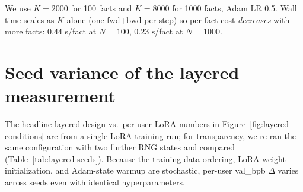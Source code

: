 \documentclass[11pt]{article}
\begin{document}
We use $K = 2000$ for 100 facts and $K = 8000$ for 1000 facts, Adam
LR 0.5. Wall time scales as $K$ alone (one fwd+bwd per step) so per-fact
cost \emph{decreases} with more facts: 0.44 s/fact at $N{=}100$,
0.23 s/fact at $N{=}1000$.

\section{Seed variance of the layered measurement}
\label{app:layered-seeds}

The headline layered-design vs.\ per-user-LoRA numbers in
Figure~\ref{fig:layered-conditions} are
from a single LoRA training run; for transparency, we re-ran the same
configuration with two further RNG states and compared
(Table~\ref{tab:layered-seeds}). Because the
training-data ordering, LoRA-weight initialization, and Adam-state
warmup are stochastic, per-user val\_bpb $\Delta$ varies across seeds
even with identical hyperparameters.
\end{document}
